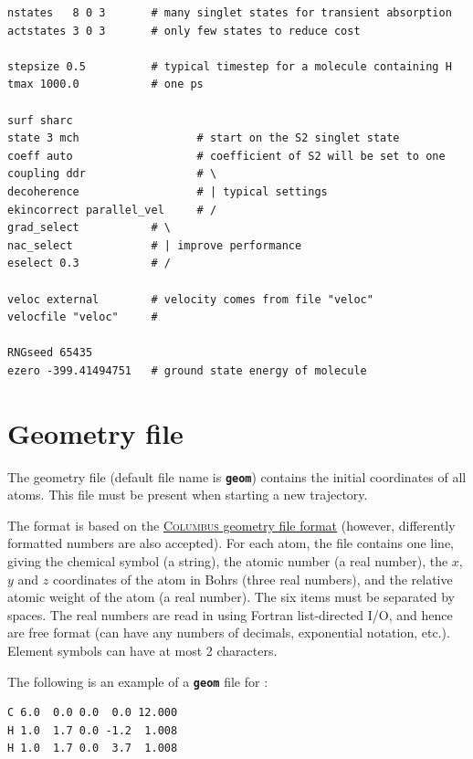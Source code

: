 \documentclass[a4paper,11pt,DIV=15,openany,twoside=false]{scrbook}
\newcommand{\ttt}[1]{\textbf{\texttt{#1}}}
\newenvironment{example}{
  \vspace{0mm}
  \definecolor{shadecolor}{HTML}{E4F4FF}
  \begin{shaded}
}{
  \end{shaded}
}
\begin{document}
\begin{example}
  \begin{verbatim}
nstates   8 0 3       # many singlet states for transient absorption
actstates 3 0 3       # only few states to reduce cost

stepsize 0.5          # typical timestep for a molecule containing H
tmax 1000.0           # one ps

surf sharc
state 3 mch                  # start on the S2 singlet state
coeff auto                   # coefficient of S2 will be set to one
coupling ddr                 # \
decoherence                  # | typical settings
ekincorrect parallel_vel     # /
grad_select           # \
nac_select            # | improve performance
eselect 0.3           # /

veloc external        # velocity comes from file "veloc"
velocfile "veloc"     #

RNGseed 65435
ezero -399.41494751   # ground state energy of molecule
  \end{verbatim}
\end{example}



\section{Geometry file}\label{sec:geomfile}

The geometry file (default file name is \ttt{geom}) contains the initial coordinates of all atoms. This file must be present when starting a new trajectory.

The format is based on the \href{http://www.univie.ac.at/columbus/docs_COL70/documentation_main.html}{\textsc{Columbus} geometry file format} (however, differently formatted numbers are also accepted). For each atom, the file contains one line, giving the chemical symbol (a string), the atomic number (a real number), the $x$, $y$ and $z$ coordinates of the atom in Bohrs (three real numbers), and the relative atomic weight of the atom (a real number). The six items must be separated by spaces. The real numbers are read in using Fortran list-directed I/O, and hence are free format (can have any numbers of decimals, exponential notation, etc.). Element symbols can have at most 2 characters.

The following is an example of a \ttt{geom} file for \ce{CH2}:
\begin{example}
  \begin{verbatim}
C 6.0  0.0 0.0  0.0 12.000
H 1.0  1.7 0.0 -1.2  1.008
H 1.0  1.7 0.0  3.7  1.008
  \end{verbatim}
\end{example}
\end{document}
